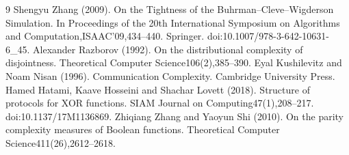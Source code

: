\begin{thebibliography}{9}
 Shengyu Zhang (2009). On the Tightness of the Buhrman--Cleve--Wigderson Simulation. In Proceedings of the 20th International Symposium on Algorithms and Computation,ISAAC'09,434--440. Springer. doi:10.1007/978-3-642-10631-6\_45.
 Alexander Razborov (1992). On the distributional complexity of disjointness. Theoretical Computer Science106(2),385--390.
 Eyal Kushilevitz and Noam Nisan (1996). Communication Complexity. Cambridge University Press.
 Hamed Hatami, Kaave Hosseini and Shachar Lovett (2018). Structure of protocols for XOR functions. SIAM Journal on Computing47(1),208--217. doi:10.1137/17M1136869.
 Zhiqiang Zhang and Yaoyun Shi (2010). On the parity complexity measures of Boolean functions. Theoretical Computer Science411(26),2612--2618.
\end{thebibliography}
